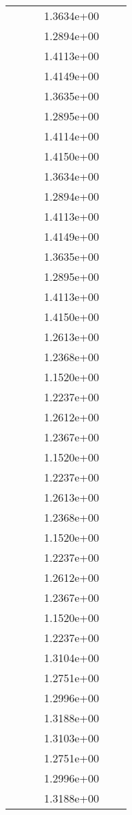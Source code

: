 \begin{xltabular}{\textwidth}{r|rS[table-format=1.3e+2]S[table-format=1.4e+2]S[table-format=1.4e+2]S[table-format=-1.5]}
&  &  & 1.3634e+00 & & \\
&  &  & 1.2894e+00 & & \\
&  &  & 1.4113e+00 & & \\
&  &  & 1.4149e+00 & & \\
&  &  & 1.3635e+00 & & \\
&  &  & 1.2895e+00 & & \\
&  &  & 1.4114e+00 & & \\
&  &  & 1.4150e+00 & & \\
&  &  & 1.3634e+00 & & \\
&  &  & 1.2894e+00 & & \\
&  &  & 1.4113e+00 & & \\
&  &  & 1.4149e+00 & & \\
&  &  & 1.3635e+00 & & \\
&  &  & 1.2895e+00 & & \\
&  &  & 1.4113e+00 & & \\
&  &  & 1.4150e+00 & & \\
&  &  & 1.2613e+00 & & \\
&  &  & 1.2368e+00 & & \\
&  &  & 1.1520e+00 & & \\
&  &  & 1.2237e+00 & & \\
&  &  & 1.2612e+00 & & \\
&  &  & 1.2367e+00 & & \\
&  &  & 1.1520e+00 & & \\
&  &  & 1.2237e+00 & & \\
&  &  & 1.2613e+00 & & \\
&  &  & 1.2368e+00 & & \\
&  &  & 1.1520e+00 & & \\
&  &  & 1.2237e+00 & & \\
&  &  & 1.2612e+00 & & \\
&  &  & 1.2367e+00 & & \\
&  &  & 1.1520e+00 & & \\
&  &  & 1.2237e+00 & & \\
&  &  & 1.3104e+00 & & \\
&  &  & 1.2751e+00 & & \\
&  &  & 1.2996e+00 & & \\
&  &  & 1.3188e+00 & & \\
&  &  & 1.3103e+00 & & \\
&  &  & 1.2751e+00 & & \\
&  &  & 1.2996e+00 & & \\
&  &  & 1.3188e+00 & & \\

\end{xltabular}

